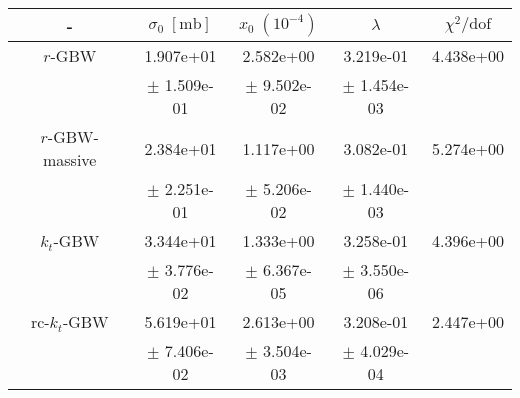 \begin{tabular}{|c|c|c|c|c|}
\hline - & $\sigma_0 \; [\mathrm{mb}]$ & $x_0\; \left(10^{-4}\right)$ & $\lambda$ & $\chi^2/\mathrm{dof}$ \\\hline 
{\footnotesize $r$-GBW} & 1.907e+01& 2.582e+00& 3.219e-01& 4.438e+00\\
&\hfill {\tiny $\pm$ 1.509e-01}&\hfill {\tiny $\pm$ 9.502e-02}&\hfill {\tiny $\pm$ 1.454e-03}& \\\hline 
{\footnotesize $r$-GBW-massive} & 2.384e+01& 1.117e+00& 3.082e-01& 5.274e+00\\
&\hfill {\tiny $\pm$ 2.251e-01}&\hfill {\tiny $\pm$ 5.206e-02}&\hfill {\tiny $\pm$ 1.440e-03}& \\\hline 
{\footnotesize $k_t$-GBW} & 3.344e+01& 1.333e+00& 3.258e-01& 4.396e+00\\
&\hfill {\tiny $\pm$ 3.776e-02}&\hfill {\tiny $\pm$ 6.367e-05}&\hfill {\tiny $\pm$ 3.550e-06}& \\\hline 
{\footnotesize rc-$k_t$-GBW} & 5.619e+01& 2.613e+00& 3.208e-01& 2.447e+00\\
&\hfill {\tiny $\pm$ 7.406e-02}&\hfill {\tiny $\pm$ 3.504e-03}&\hfill {\tiny $\pm$ 4.029e-04}& \\\hline 
\end{tabular}